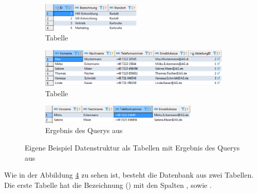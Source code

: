 \begin{figure}[ht]
  \centering
  \begin{subfigure}[h]{\textwidth}
    \centering
    \includegraphics[width=0.517045455\textwidth]{content/hauptteil/theoretischeGrundlagen/rec/exampleSQLAbteilung.pdf}
    \caption{Tabelle }
    \label{fig:exampleSQLStructure:abteilung}
    \hspace{50.00mm}
  \end{subfigure}
  \begin{subfigure}[h]{\textwidth}
      \centering
      \includegraphics[width=\textwidth]{content/hauptteil/theoretischeGrundlagen/rec/exampleSQLMitarbeiterdaten.pdf}
      \caption{Tabelle }
      \label{fig:exampleSQLStructure:mitarbeiter}
      \hspace{50.00mm}
  \end{subfigure}
  \begin{subfigure}[h]{\textwidth}
      \centering
      \includegraphics[width=0.825284091\textwidth]{content/hauptteil/theoretischeGrundlagen/rec/exampleSQLErgebnis.pdf}
      \caption{Ergebnis des Querys aus }
      \label{fig:exampleSQLStructure:result}
  \end{subfigure}
  \caption[Beispiel Datenstruktur mit Ergebnis von einem  Query]{Eigene Beispiel Datenstruktur als Tabellen mit Ergebnis des Querys aus }
  \label{fig:exampleSQLStructure}
\end{figure}
Wie in der Abbildung \ref{fig:exampleSQLStructure} zu sehen ist, besteht die Datenbank aus zwei Tabellen.
Die erste Tabelle hat die Bezeichnung  () mit den Spalten ,  sowie .
